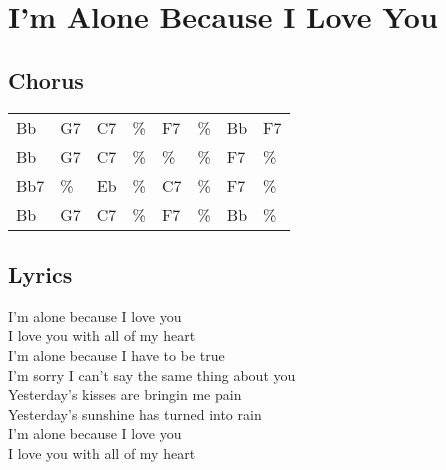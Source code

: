 \section{I'm Alone Because I Love You}


\subsection*{Chorus}


\begin{tabular}{l l l l l l l l}
Bb & G7 & C7 & \% & F7 & \% & Bb & F7 \\ 
Bb & G7 & C7 & \% & \% & \% & F7 & \% \\ 
Bb7 & \% & Eb & \% & C7 & \% & F7 & \% \\ 
Bb & G7 & C7 & \% & F7 & \% & Bb & \% \\ 
\end{tabular}


\subsection*{Lyrics}


I'm alone because I love you  \\ 
I love you with all of my heart \\ 
I'm alone because I have to be true \\ 
I'm sorry I can't say the same thing about you \\ 

Yesterday's kisses are bringin me pain \\ 
Yesterday's sunshine has turned into rain \\ 

I'm alone because I love you \\ 
I love you with all of my heart \\ 
